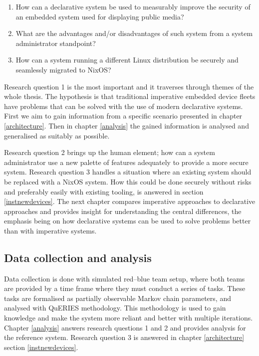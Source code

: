 \begin{enumerate}
\item How can a declarative system be used to measurably improve the
  security of an embedded system used for displaying public media?
\item What are the advantages and/or disadvantages of such system from
  a system administrator standpoint?
\item How can a system running a different Linux distribution be securely and seamlessly migrated to NixOS?
\end{enumerate}

Research question 1 is the most important and it traverses through
themes of the whole thesis. The hypothesis is that traditional
imperative embedded device fleets have problems that can be solved
with the use of modern declarative systems. First we aim to gain
information from a specific scenario presented in chapter
\ref{architecture}. Then in chapter \ref{analysis} the gained
information is analysed and generalised as suitably as possible.

Research question 2 brings up the human element; how can a system
administrator use a new palette of features adequately to provide a more
secure system. Research question 3 handles a situation where
an existing system should be replaced with a NixOS system. How this could
be done securely without risks and preferably easily with existing
tooling, is answered in section
\ref{instnewdevices}. The next chapter compares imperative approaches
to declarative approaches and provides insight for understanding the
central differences, the emphasis being on how declarative systems can be
used to solve problems better than with imperative systems.

\subsection{Data collection and analysis}

Data collection is done with simulated red–blue team setup, where both
teams are provided by a time frame where they must conduct a series of
tasks. These tasks are formalised as partially observable Markov chain
parameters, and analysed with QuERIES methodology. This methodology is
used to gain knowledge and make the system more reliant and better
with multiple iterations. Chapter \ref{analysis} answers research
questions 1 and 2 and provides analysis for the reference
system. Research question 3 is answered in chapter \ref{architecture}
section \ref{instnewdevices}.
